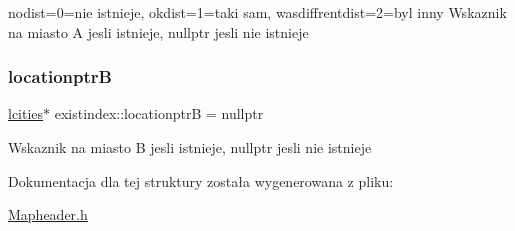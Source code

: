 nodist=0=nie istnieje, okdist=1=taki sam, wasdiffrentdist=2=byl inny Wskaznik na miasto A jesli istnieje, nullptr jesli nie istnieje \mbox{\label{structexistindex_a2ce546bc2977c9c9e11eedf030fc8bd2}} 
\subsubsection{\texorpdfstring{locationptrB}{locationptrB}}
{\footnotesize\ttfamily \mbox{\hyperlink{structlcities}{lcities}}$\ast$ existindex\+::locationptrB = nullptr}

Wskaznik na miasto B jesli istnieje, nullptr jesli nie istnieje 

Dokumentacja dla tej struktury została wygenerowana z pliku\+:\begin{DoxyCompactItemize}
\item 
\mbox{\hyperlink{_mapheader_8h}{Mapheader.\+h}}\end{DoxyCompactItemize}
